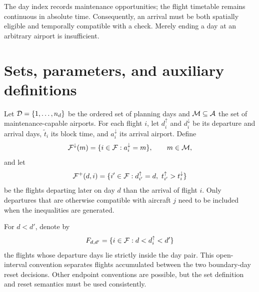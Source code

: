 The day index records maintenance opportunities; the flight timetable remains
continuous in absolute time. Consequently, an arrival must be both spatially
eligible and temporally compatible with a check. Merely ending a day at an
arbitrary airport is insufficient.

\section{Sets, parameters, and auxiliary definitions}

Let $\mathcal{D}=\{1,\ldots,n_d\}$ be the ordered set of planning days and
$\mathcal{M}\subseteq\mathcal{A}$ the set of maintenance-capable airports. For each flight
$i$, let $d_i^{\uparrow}$ and $d_i^{\downarrow}$ be its departure and arrival
days, $\tilde t_i$ its block time, and $a_i^{\downarrow}$ its arrival airport.
Define
\begin{equation}
    \mathcal{F}^{\downarrow}(m)
    =\{i\in\mathcal{F}:a_i^{\downarrow}=m\},
    \qquad m\in\mathcal{M},
    \label{eq:maint_eligible_arrivals}
\end{equation}
and let
\begin{equation}
    \mathcal{F}^{+}(d,i)
    =\{i'\in\mathcal{F}:d_{i'}^{\uparrow}=d,
      \ t_{i'}^{\uparrow}>t_i^{\downarrow}\}
    \label{eq:maint_later_flights}
\end{equation}
be the flights departing later on day $d$ than the arrival of flight $i$.
Only departures that are otherwise compatible with aircraft $j$ need to be
included when the inequalities are generated.

For $d<d'$, denote by
\begin{equation}
    F_{d,d'}
    =\{i\in\mathcal{F}:d<d_i^{\uparrow}<d'\}
    \label{eq:maint_day_interval}
\end{equation}
the flights whose departure days lie strictly inside the day pair. This
open-interval convention separates flights accumulated between the two
boundary-day reset decisions. Other endpoint conventions are possible, but
the set definition and reset semantics must be used consistently.


